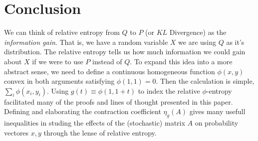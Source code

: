 \section{Conclusion}
We can think of relative entropy from $Q$ to $P$ (or $KL$ Divergence) as the \textit{information gain}. That is, we have a random variable $X$ we are using $Q$ as it's distribution. The relative entropy tells us how much information we could gain about $X$ if we were to use $P$ instead of $Q$. To expand this idea into a more abstract sense, we need to define a continuous homogeneous function $\phi(x,y)$ convex in both arguments satisfying $\phi(1,1)=0$. Then the calculation is simple, $\sum_i \phi(x_i, y_i)$. Using $g(t) \equiv \phi(1, 1+t)$ to index the relative $\phi$-entropy facilitated many of the proofs and lines of thought presented in this paper. Defining and elaborating the contraction coefficient $\eta_g(A)$ gives many usefull inequalities in studing the effects of the (stochastic) matrix $A$ on probability vectores $x,y$ through the lense of relative entropy.

